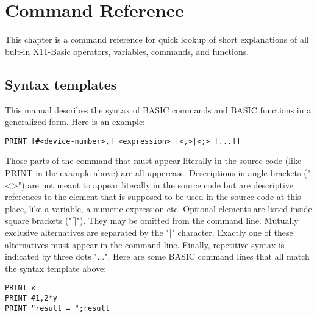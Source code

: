 \chapter{Command Reference}

This chapter is a command reference for quick lookup of short explanations of 
all bult-in X11-Basic operators, variables, commands, and functions.

\section{Syntax templates}

This manual describes the syntax of BASIC commands and BASIC functions  in
a generalized form. Here is an example:

\begin{mdframed}[hidealllines=true,backgroundcolor=yellow!20]
\begin{verbatim}
PRINT [#<device-number>,] <expression> [<,>|<;> [...]]
\end{verbatim}
\end{mdframed}

Those parts of the command that must appear literally in the  source  code
(like PRINT in the example above) are all uppercase. Descriptions in angle
brackets ("<>") are not meant to appear literally in the source  code  but
are  descriptive  references to the element that is supposed to be used in
the source code at this place, like a variable, a numeric expression  etc.
Optional elements are listed inside square brackets ("[]").  They  may  be
omitted  from  the  command  line.  Mutually  exclusive  alternatives  are
separated by the "|" character. Exactly  one  of  these  alternatives must
appear  in  the  command  line. Finally, repetitive syntax is indicated by
three dots "...". Here are some BASIC command lines  that  all  match  the
syntax template above:

\begin{mdframed}[hidealllines=true,backgroundcolor=blue!20]
\begin{verbatim}
PRINT x
PRINT #1,2*y
PRINT "result = ";result
\end{verbatim}
\end{mdframed}

